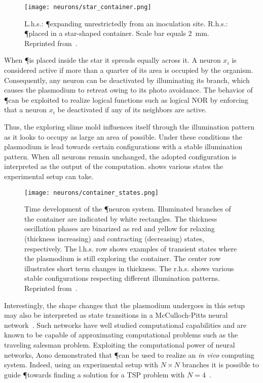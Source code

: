 			\begin{figure}[!htbp]
			\centering
			\texttt{[image: neurons/star\_container.png]}
			\caption[\P neurons - Setup]{L.h.s.: \P expanding unrestrictedly from an inoculation site. R.h.s.: \P placed in a star-shaped container. Scale bar equals \SI{2}{\milli\metre}. Reprinted from~\cite{Aono:2007:ANC:1284621.1284651}.}
			\label{fig:neurons_setup}
			\end{figure}

			When \P is placed inside the star it spreads equally across it. A neuron $x_i$ is considered active if more than a quarter of its area is occupied by the organism. Consequently, any neuron can be deactivated by illuminating its branch, which causes the plasmodium to retreat owing to its photo avoidance. The behavior of \P can be exploited to realize logical functions such as logical NOR by enforcing that a neuron $x_i$ be deactivated if any of its neighbors are active. 

			Thus, the exploring slime mold influences itself through the illumination pattern as it looks to occupy as large an area of possible. Under these conditions the plasmodium is lead towards certain configurations with a stable illumination pattern. When all neurons remain unchanged, the adopted configuration is interpreted as the output of the computation.  shows various states the experimental setup can take.

			\begin{figure}[!htbp]
			\centering
			\texttt{[image: neurons/container\_states.png]}
			\caption[\P neurons - State transitions]{Time development of the \P neuron system. Illuminated branches of the container are indicated by white rectangles. The thickness oscillation phases are binarized as red and yellow for relaxing (thickness increasing) and contracting (decreasing) states, respectively. The l.h.s. row shows examples of transient states where the plasmodium is still exploring the container. The center row illustrates short term changes in thickness. The r.h.s. shows various stable configurations respecting different illumination patterns. Reprinted from~\cite{Aono:2007:ANC:1284621.1284651}. }
			\label{fig:neurons_states}
			\end{figure}

			Interestingly, the shape changes that the plasmodium undergoes in this setup may also be interpreted as state transitions in a McCulloch-Pitts neural network~\cite{Aono:2007:ANC:1284621.1284651}. Such networks have well studied computational capabilities and are known to be capable of approximating computational problems such as the traveling salesman problem. Exploiting the computational power of neural networks, Aono \etal demonstrated that \P can be used to realize an \textit{in vivo} computing system. Indeed, using an experimental setup with $N \times N$ branches it is possible to guide \P towards finding a solution for a TSP problem with $N=4$~\cite{Aono2009}. 


